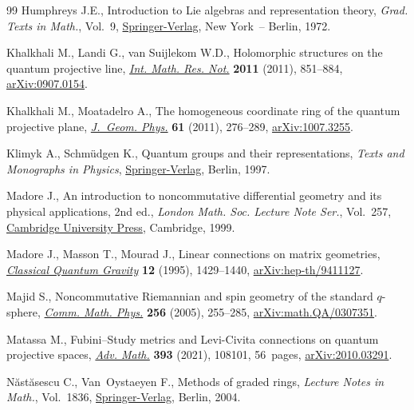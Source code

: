 \documentclass[pdftex]{sigma}
\numberwithin{equation}{section}
\begin{document}
\begin{thebibliography}{99}
Humphreys J.E., Introduction to {L}ie algebras and representation theory,
 \textit{Grad. Texts in Math.}, Vol.~9, \href{https://doi.org/10.1007/978-1-4612-6398-2}{Springer-Verlag}, New York~-- Berlin,
 1972.

Khalkhali M., Landi G., van Suijlekom W.D., Holomorphic structures on the
 quantum projective line, \href{https://doi.org/10.1093/imrn/rnq097}{\textit{Int. Math. Res. Not.}} \textbf{2011} (2011),
 851--884, \href{https://arxiv.org/abs/0907.0154}{arXiv:0907.0154}.

Khalkhali M., Moatadelro A., The homogeneous coordinate ring of the quantum
 projective plane, \href{https://doi.org/10.1016/j.geomphys.2010.09.014}{\textit{J.~Geom. Phys.}} \textbf{61} (2011), 276--289,
 \href{https://arxiv.org/abs/1007.3255}{arXiv:1007.3255}.

Klimyk A., Schm\"{u}dgen K., Quantum groups and their representations, \textit{Texts
 and Monographs in Physics}, \href{https://doi.org/10.1007/978-3-642-60896-4}{Springer-Verlag}, Berlin, 1997.

Madore J., An introduction to noncommutative differential geometry and its
 physical applications, 2nd ed., \textit{London Math. Soc. Lecture Note Ser.}, Vol.~257, \href{https://doi.org/10.1017/CBO9780511569357}{Cambridge University Press}, Cambridge, 1999.

Madore J., Masson T., Mourad J., Linear connections on matrix geometries,
 \href{https://doi.org/10.1088/0264-9381/12/6/009}{\textit{Classical Quantum Gravity}} \textbf{12} (1995), 1429--1440,
 \href{https://arxiv.org/abs/hep-th/9411127}{arXiv:hep-th/9411127}.

Majid S., Noncommutative {R}iemannian and spin geometry of the standard
 {$q$}-sphere, \href{https://doi.org/10.1007/s00220-005-1295-8}{\textit{Comm. Math. Phys.}} \textbf{256} (2005), 255--285,
 \href{https://arxiv.org/abs/math.QA/0307351}{arXiv:math.QA/0307351}.

Matassa M., Fubini--{S}tudy metrics and {L}evi-{C}ivita connections on quantum
 projective spaces, \href{https://doi.org/10.1016/j.aim.2021.108101}{\textit{Adv. Math.}} \textbf{393} (2021), 108101, 56~pages,
 \href{https://arxiv.org/abs/2010.03291}{arXiv:2010.03291}.

N\u{a}st\u{a}sescu C., Van~Oystaeyen F., Methods of graded rings,
 \textit{Lecture Notes in Math.}, Vol.~1836, \href{https://doi.org/10.1007/b94904}{Springer-Verlag}, Berlin, 2004.


\end{thebibliography}
\end{document}
